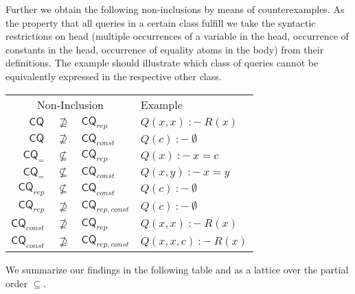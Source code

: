 \documentclass[a4paper,12pt]{article}
\newcommand{\cq}[1]{\ensuremath{\mathsf{CQ}_{#1}}}
\newcommand{\query}[3]{\ensuremath{{#1}({#2})\:{:}{-}\:{#3}}}
\begin{document}
Further we obtain the following non-inclusions by means of counterexamples. As the property that all queries in a certain class fulfill we take the syntactic restrictions on head (multiple occurrences of a variable in the head, occurrence of constants in the head, occurrence of equality atoms in the body) from their definitions. The example should illustrate which class of queries cannot be equivalently expressed in the respective other class.

\begin{center}
\begin{tabular}{rcll}
\multicolumn{3}{c}{Non-Inclusion} & Example \\
$\cq{}$ & $\not \supseteq$ & $\cq{rep}$ & $\query{Q}{x,x}{R(x)}$ \\
$\cq{}$ & $\not \supseteq$ & $\cq{const}$ & $\query{Q}{c}{\emptyset}$ \\
$\cq{=}$ & $\not \subseteq$ & $\cq{rep}$ & $\query{Q}{x}{x = c}$ \\
$\cq{=}$ & $\not \subseteq$ & $\cq{const}$ & $\query{Q}{x,y}{x = y}$ \\
$\cq{rep}$ & $\not \subseteq$ & $\cq{const}$ & $\query{Q}{c}{\emptyset}$ \\
$\cq{rep}$ & $\not \supseteq$ & $\cq{rep,const}$ & $\query{Q}{c}{\emptyset}$ \\
$\cq{const}$ & $\not \supseteq$ & $\cq{rep}$ & $\query{Q}{x,x}{R(x)}$ \\
$\cq{const}$ & $\not \supseteq$ & $\cq{rep,const}$ & $\query{Q}{x,x,c}{R(x)}$
\end{tabular}
\end{center}

We summarize our findings in the following table and as a lattice over the partial order $\subseteq$.
\end{document}
